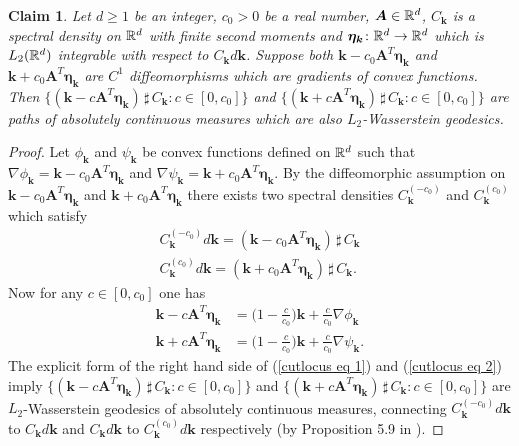 \documentclass[10pt,noinfoline]{imsart}
\newtheorem{claim}{Claim}
\newcommand{\bs}{\boldsymbol}
\begin{document}
\begin{claim}
\label{claim: cut locus}
Let $d\geq 1$ be an integer, $c_0 > 0$ be a real number, $\bs A\in \Bbb R^d$, $C_{\bs k}$ is a spectral density on $\Bbb R^d$ with finite second moments and $\bs \eta_{\bs k}\colon \Bbb R^d \rightarrow \Bbb R^d$ which is $L_2(\Bbb R^d)$ integrable with respect to $C_{\bs k}d\bs k$.
Suppose both 
$\bs k - c_0\bs A^T\bs \eta_{\bs k}$ and $\bs k + c_0\bs A^T\bs \eta_{\bs k}$
are $C^1$ diffeomorphisms which are gradients of convex functions. Then 
$\{(\bs k - c\bs A^T\bs \eta_{\bs k})\,\sharp\,C_{\bs k}\colon c\in[0,c_0]\}$ and $\{(\bs k + c\bs A^T\bs \eta_{\bs k})\,\sharp\,C_{\bs k}\colon c\in[0,c_0]\}$ are paths of absolutely continuous measures which are also $L_2$-Wasserstein geodesics. 
\end{claim}
\begin{proof}
Let $\phi_{\bs k}$ and $\psi_{\bs k}$ be convex functions defined on $\Bbb R^d$ such that $\nabla \phi_{\bs k}=\bs k - c_0\bs A^T\bs \eta_{\bs k}$ and $\nabla \psi_{\bs k}=\bs k + c_0\bs A^T\bs \eta_{\bs k}$. By the diffeomorphic assumption on $\bs k - c_0\bs A^T\bs \eta_{\bs k}$ and $\bs k + c_0\bs A^T\bs \eta_{\bs k}$ there exists two spectral densities $C^{(-c_0)}_{\bs k}$ and $C^{(c_0)}_{\bs k}$ which satisfy 
\begin{align*}
C^{(-c_0)}_{\bs k}d\bs k = (\bs k - c_0\bs A^T\bs \eta_{\bs k})\,\sharp\, C_{\bs k} \\
C^{(c_0)}_{\bs k}d\bs k  = (\bs k + c_0\bs A^T\bs \eta_{\bs k})\,\sharp\, C_{\bs k} .
\end{align*} 
Now for any $c\in[0,c_0]$ one has
\begin{align}
\bs k - c\bs A^T\bs\eta_{\bs k} &= \big(1-\textstyle\frac{c}{c_0}\big)\bs k + \textstyle\frac{c}{c_0}\nabla\phi_{\bs k}\label{cutlocus eq 1} \\
\bs k + c\bs A^T\bs\eta_{\bs k} &= \big(1-\textstyle\frac{c}{c_0}\big)\bs k + \textstyle\frac{c}{c_0}\nabla\psi_{\bs k}\label{cutlocus eq 2}.
\end{align} 
The explicit form of the right hand side of (\ref{cutlocus eq 1}) and (\ref{cutlocus eq 2}) imply $\{ (\bs k - c\bs A^T\bs \eta_{\bs k})\,\sharp\, C_{\bs k} :c\in[0,c_0]\}$  and  $\{ (\bs k + c\bs A^T\bs \eta_{\bs k})\,\sharp\, C_{\bs k} :c\in[0,c_0]\}$  are $L_2$-Wasserstein geodesics of absolutely continuous measures, connecting $C^{(-c_0)}_{\bs k}d\bs k$ to $C_{\bs k}d\bs k $ and  $C_{\bs k}d\bs k$ to $C^{(c_0)}_{\bs k} d\bs k$ respectively (by Proposition 5.9 in \cite{villani2003topics}).
\end{proof}
\end{document}
